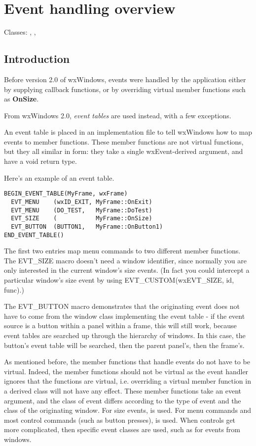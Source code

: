 \section{Event handling overview}\label{eventhandlingoverview}

Classes: , , 

\subsection{Introduction}

Before version 2.0 of wxWindows, events were handled by the application
either by supplying callback functions, or by overriding virtual member
functions such as {\bf OnSize}.

From wxWindows 2.0, {\it event tables} are used instead, with a few exceptions.

An event table is placed in an implementation file to tell wxWindows how to map
events to member functions. These member functions are not virtual functions, but
they all similar in form: they take a single wxEvent-derived argument, and have a void return
type.

Here's an example of an event table.

\begin{verbatim}
BEGIN_EVENT_TABLE(MyFrame, wxFrame)
  EVT_MENU    (wxID_EXIT, MyFrame::OnExit)
  EVT_MENU    (DO_TEST,   MyFrame::DoTest)
  EVT_SIZE    (           MyFrame::OnSize)
  EVT_BUTTON  (BUTTON1,   MyFrame::OnButton1)
END_EVENT_TABLE()
\end{verbatim}

The first two entries map menu commands to two different member functions. The EVT\_SIZE macro
doesn't need a window identifier, since normally you are only interested in the
current window's size events. (In fact you could intercept a particular window's size event
by using EVT\_CUSTOM(wxEVT\_SIZE, id, func).)

The EVT\_BUTTON macro demonstrates that the originating event does not have to come from
the window class implementing the event table - if the event source is a button within a panel within a frame, this will still
work, because event tables are searched up through the hierarchy of windows. In this
case, the button's event table will be searched, then the parent panel's, then the frame's.

As mentioned before, the member functions that handle events do not have to be virtual.
Indeed, the member functions should not be virtual as the event handler ignores that
the functions are virtual, i.e. overriding a virtual member function in a derived class
will not have any effect.
These member functions take an event argument, and the class of event differs according
to the type of event and the class of the originating window. For size
events,  is used. For menu commands and most control
commands (such as button presses),  is used.
When controls get more complicated, then specific event classes are used, such
as  for events from  windows.

